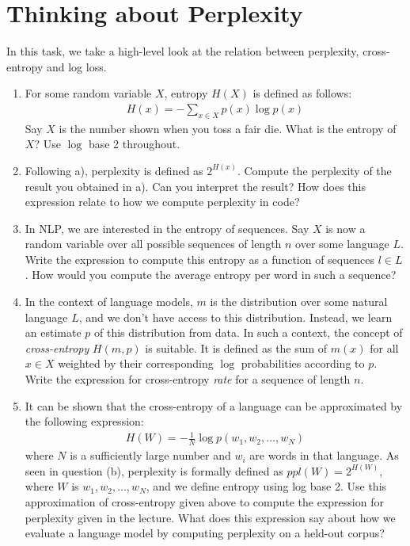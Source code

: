 \documentclass[11pt,a4paper]{article}
\begin{document}
\section{Thinking about Perplexity}

In this task, we take a high-level look at the relation between perplexity,
cross-entropy and log loss.

\begin{enumerate}[label=(\alph*)]
    \item For some random variable $X$, entropy $H(X)$ is defined as follows:
          \begin{align}\label{eq:def_entropy}
              H(x) = -\sum_{x\in X} p(x)\log p(x)
          \end{align}
          Say $X$ is the number shown when you toss a fair die.
          What is the entropy of $X$?
          Use $\log$ base 2 throughout.
    \item Following a), perplexity is defined as $2^{H(x)}$. Compute the
          perplexity of the result you obtained in a).
          Can you interpret the result?
          How does this expression relate to how we compute perplexity in code?
    \item In NLP, we are interested in the entropy of sequences.
          Say $X$ is now a random variable over all possible sequences of length
          $n$ over some language $L$.
          Write the expression to compute this entropy as a function of 
          sequences $l\in L$.
          How would you compute the average entropy per word in such a sequence?
    \item In the context of language models, $m$ is the distribution over some
          natural language $L$, and we don't have access to this distribution.
          Instead, we learn an estimate $p$ of this distribution from data.
          In such a context, the concept of \emph{cross-entropy} $H(m,p)$ is
          suitable.
          It is defined as the sum of $m(x)$ for all $x\in X$ weighted by their
          corresponding $\log$ probabilities according to $p$.
          Write the expression for cross-entropy \emph{rate} for a sequence of 
          length $n$.
    \item It can be shown that the cross-entropy of a language can be
          approximated by the following expression:
          \begin{align}\label{eq:language_entropy}
              H(W) = -\frac{1}{N} \log p(w_1,w_2,\ldots,w_N)
          \end{align}
          where $N$ is a sufficiently large number and $w_i$ are words in that
          language.
          As seen in question (b), perplexity is formally defined as
          $ppl(W) = 2^{H(W)}$, where $W$ is $w_1, w_2, \ldots, w_N$, and we
          define entropy using log base 2.
          Use this approximation of cross-entropy given above to compute the
          expression for perplexity given in the lecture.
          What does this expression say about how we evaluate a language
          model by computing perplexity on a held-out corpus?
\end{enumerate}
\end{document}
